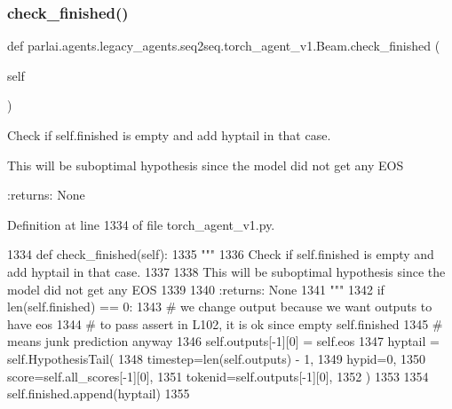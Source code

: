 \subsubsection{\texorpdfstring{check\+\_\+finished()}{check\_finished()}}
{\footnotesize\ttfamily def parlai.\+agents.\+legacy\+\_\+agents.\+seq2seq.\+torch\+\_\+agent\+\_\+v1.\+Beam.\+check\+\_\+finished (\begin{DoxyParamCaption}\item[{}]{self }\end{DoxyParamCaption})}

\begin{DoxyVerb}Check if self.finished is empty and add hyptail in that case.

This will be suboptimal hypothesis since the model did not get any EOS

:returns: None
\end{DoxyVerb}
 

Definition at line 1334 of file torch\+\_\+agent\+\_\+v1.\+py.


\begin{DoxyCode}
1334     \textcolor{keyword}{def }check\_finished(self):
1335         \textcolor{stringliteral}{"""}
1336 \textcolor{stringliteral}{        Check if self.finished is empty and add hyptail in that case.}
1337 \textcolor{stringliteral}{}
1338 \textcolor{stringliteral}{        This will be suboptimal hypothesis since the model did not get any EOS}
1339 \textcolor{stringliteral}{}
1340 \textcolor{stringliteral}{        :returns: None}
1341 \textcolor{stringliteral}{        """}
1342         \textcolor{keywordflow}{if} len(self.finished) == 0:
1343             \textcolor{comment}{# we change output because we want outputs to have eos}
1344             \textcolor{comment}{# to pass assert in L102, it is ok since empty self.finished}
1345             \textcolor{comment}{# means junk prediction anyway}
1346             self.outputs[-1][0] = self.eos
1347             hyptail = self.HypothesisTail(
1348                 timestep=len(self.outputs) - 1,
1349                 hypid=0,
1350                 score=self.all\_scores[-1][0],
1351                 tokenid=self.outputs[-1][0],
1352             )
1353 
1354             self.finished.append(hyptail)
1355 
\end{DoxyCode}
\mbox{\label{classparlai_1_1agents_1_1legacy__agents_1_1seq2seq_1_1torch__agent__v1_1_1Beam_a8b62a64897663062c4e3cf9cf85fce50}} 
